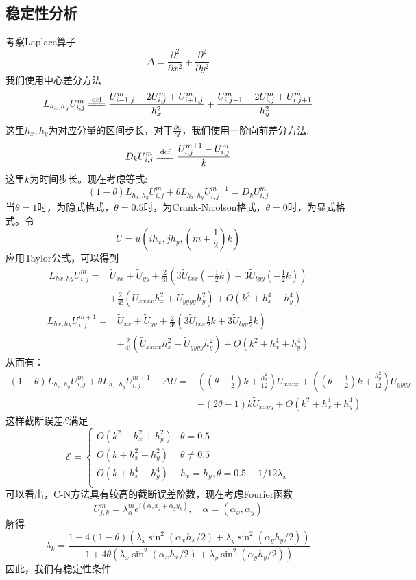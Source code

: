 \documentclass[12pt]{ctexart}
\newcommand{\eqdef}{\xlongequal{\text{def}}}%
\begin{document}
\subsection{稳定性分析}
考察Laplace算子$$\Delta = \frac{\partial^2}{\partial x^2} + \frac{\partial^2}{\partial y^2}$$
\noindent 我们使用中心差分方法
$$
L_{h_x,h_y}U_{i,j}^m \eqdef \frac{U_{i-1,j}^m-2U_{i,j}^m+U_{i+1,j}^m}{h_x^2} + \frac{U_{i,j-1}^m-2U_{i,j}^m+U_{i,j+1}^m}{h_y^2}
$$
\noindent
这里$h_x,h_y$为对应分量的区间步长，对于$\frac{\partial u}{\partial t}$，\noindent 我们使用一阶向前差分方法:
$$
D_k U_{i,j}^m \eqdef \frac{U_{i,j}^{m+1}-U_{i,j}^m}{k}
$$
这里$k$为时间步长。现在考虑等式:
$$
(1-\theta)L_{h_x,h_y}U_{i,j}^m+\theta L_{h_x,h_y}U_{i,j}^{m+1} = D_kU_{i,j}^m
$$
当$\theta = 1$时，为隐式格式，$\theta=0.5$时，为Crank-Nicolson格式，$\theta=0$时，为显式格式。令
$$\tilde{U} = u\left(ih_x,jh_y,\left(m+\frac{1}{2}\right)k\right)$$
应用Taylor公式，可以得到
$$
\begin{aligned}
L_{hx,hy}U_{i,j}^m =& \tilde{U}_{xx} + \tilde{U}_{yy} + \frac{2}{3!}\left(3\tilde{U}_{txx}\left(-\frac{1}{2}k\right)+3\tilde{U}_{tyy}\left(-\frac{1}{2}k\right)\right) \\
&+\frac{2}{4!}\left(\tilde{U}_{xxxx}h_x^2+\tilde{U}_{yyyy}h_y^2\right)+O(k^2+h_x^4+h_y^4)
\end{aligned}
$$
$$
\begin{aligned}
L_{hx,hy}U_{i,j}^{m+1} =& \tilde{U}_{xx} + \tilde{U}_{yy} + \frac{2}{3!}\left(3\tilde{U}_{txx}\frac{1}{2}k+3\tilde{U}_{tyy}\frac{1}{2}k\right) \\
&+\frac{2}{4!}\left(\tilde{U}_{xxxx}h_x^2+\tilde{U}_{yyyy}h_y^2\right)+O(k^2+h_x^4+h_y^4)
\end{aligned}
$$
从而有：
$$
\begin{aligned}
(1-\theta)L_{h_x,h_y}U_{i,j}^m+\theta L_{h_x,h_y}U_{i,j}^{m+1} - \Delta \tilde{U} =& \left(\left(\theta - \frac{1}{2}\right)k+\frac{h_x^2}{12}\right)\tilde{U}_{xxxx}+\left(\left(\theta - \frac{1}{2}\right)k+\frac{h_y^2}{12}\right)\tilde{U}_{yyyy}\\
&+\left(2\theta - 1\right)k\tilde{U}_{xxyy} + O(k^2+h_x^4+h_y^4)
\end{aligned}
$$
\noindent
这样截断误差$\mathcal{E}$满足
$$
\mathcal{E} = 
\begin{cases}
O(k^2+h_x^2+h_y^2) & \theta = 0.5\\
O(k+h_x^2+h_y^2) & \theta \neq 0.5\\
O(k+h_x^4+h_y^4) & h_x = h_y,\theta = 0.5-1/12\lambda_x \\
\end{cases}
$$
可以看出，C-N方法具有较高的截断误差阶数，现在考虑Fourier函数
$$U_{j,k}^m =\lambda_{\alpha}^me^{i(\alpha_xx_j+\alpha_yy_k)},\quad \alpha = (\alpha_x, \alpha_y)$$
解得
$$
\lambda_k = \frac{1 - 4(1-\theta)\left(\lambda_x\sin^2(\alpha_xh_x/2)+\lambda_y\sin^2(\alpha_yh_y/2)\right)}{1+4\theta\left(\lambda_x\sin^2(\alpha_xh_x/2)+\lambda_y\sin^2(\alpha_yh_y/2)\right)}
$$
因此，我们有稳定性条件
\end{document}
